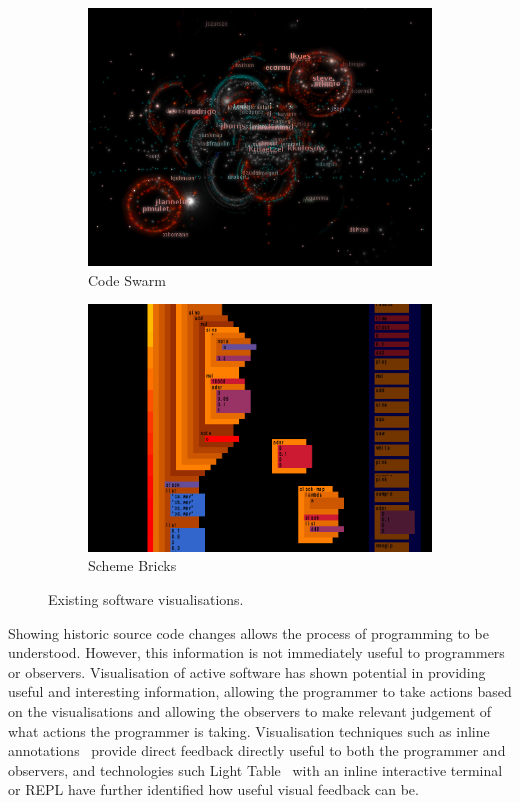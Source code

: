 \begin{figure}
\begin{subfigure}{.5\textwidth}
  \includegraphics[width=.95\linewidth]{../images/code-visualisations/code-swarm.png}
  \caption{Code Swarm}
  \label{fig:code-swarm}
\end{subfigure}%
\begin{subfigure}{.5\textwidth}
  \centering
  \includegraphics[width=.95\linewidth]{../images/code-visualisations/scheme-bricks.png}
  \caption{Scheme Bricks}
  \label{fig:scheme-bricks}
\end{subfigure}

\caption{Existing software visualisations.}
\label{fig:code-visualisations}
\end{figure}

Showing historic source code changes allows the process of programming to be understood. However, this information is not immediately useful to programmers or observers. Visualisation of active software has shown potential in providing useful and interesting information, allowing the programmer to take actions based on the visualisations and allowing the observers to make relevant judgement of what actions the programmer is taking. Visualisation techniques such as inline annotations~\cite{Swift2013} provide direct feedback directly useful to both the programmer and observers, and technologies such Light Table~\cite{Kodowa2014} with an inline interactive terminal or \ac{REPL} have further identified how useful visual feedback can be.

